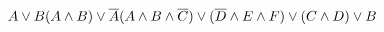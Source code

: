 \documentclass[preview]{standalone}
\begin{document}
\begin{center}
$A\lor B\\ {\displaystyle (A\land B)\lor {\overline {A}}}\\ {\displaystyle (A\land B\land {\overline {C}})\lor ({\overline {D}}\land E\land F)\lor (C\land D)\lor B}$
\end{center}
\end{document}
